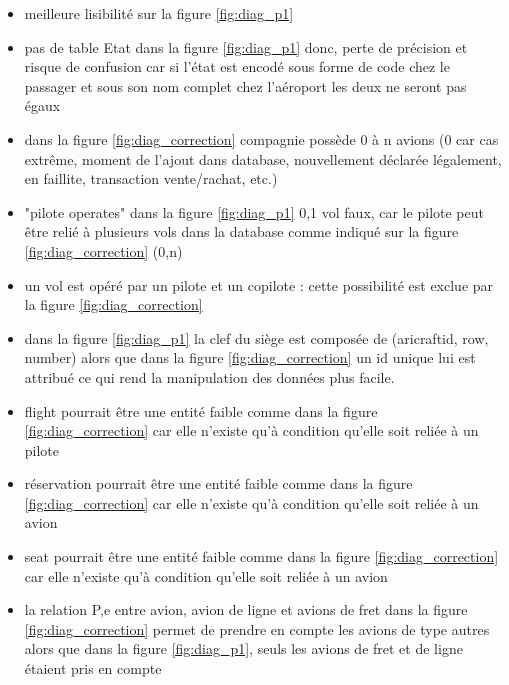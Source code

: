 \documentclass[french, utf8]{article}
\begin{document}
\begin{itemize}
    \item meilleure lisibilité sur la figure \ref{fig:diag_p1}
    \item pas de table Etat dans la figure \ref{fig:diag_p1} donc, perte de précision et risque de confusion car si l'état est encodé sous forme de code chez le passager et sous son nom complet chez l'aéroport les deux ne seront pas égaux
    \item dans la figure \ref{fig:diag_correction} compagnie possède 0 à n avions (0 car cas extrême, moment de l'ajout dans database, nouvellement déclarée légalement, en faillite, transaction vente/rachat, etc.)
    \item "pilote operates" dans la figure \ref{fig:diag_p1} 0,1 vol faux, car le pilote peut être relié à plusieurs vols dans la database comme indiqué sur la figure \ref{fig:diag_correction} (0,n)
    \item un vol est opéré par un pilote et un copilote : cette possibilité est exclue par la figure \ref{fig:diag_correction}
    \item dans la figure \ref{fig:diag_p1} la clef du siège est composée de (aricraftid, row, number) alors que dans la figure \ref{fig:diag_correction} un id unique lui est attribué ce qui rend la manipulation des données plus facile.
    \item flight pourrait être une entité faible comme dans la figure  \ref{fig:diag_correction} car elle n'existe qu'à condition qu'elle soit reliée à un pilote
    \item réservation pourrait être une entité faible comme dans la figure \ref{fig:diag_correction} car elle n'existe qu'à condition qu'elle soit reliée à un avion
    \item seat pourrait être une entité faible comme dans la figure \ref{fig:diag_correction} car elle n'existe qu'à condition qu'elle soit reliée à un avion
    \item la relation P,e entre avion, avion de ligne et avions de fret dans la figure \ref{fig:diag_correction} permet de prendre en compte les avions de type autres alors que dans la figure \ref{fig:diag_p1}, seuls les avions de fret et de ligne étaient pris en compte
\end{itemize}


\newpage
\end{document}
